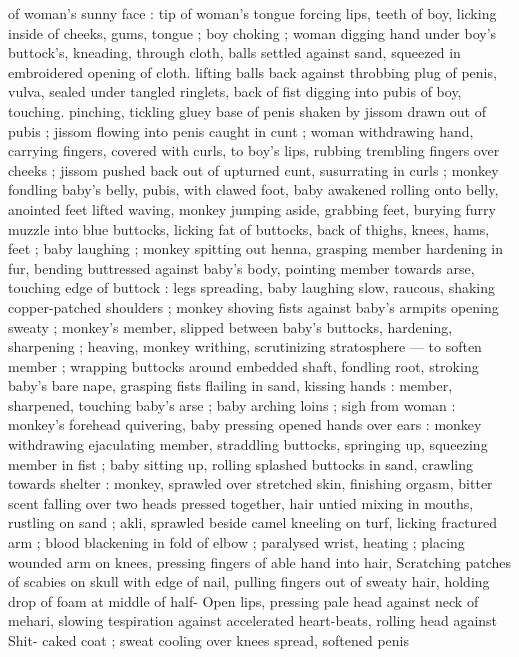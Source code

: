 {of woman's sunny face : tip of woman's tongue forcing lips, teeth of 
boy, licking inside of cheeks, gums, tongue ; boy choking ; woman 
digging hand under boy's buttock's, kneading, through cloth, balls 
settled against sand, squeezed in embroidered opening of cloth. 
lifting balls back against throbbing plug of penis, vulva, sealed under 
tangled ringlets, back of fist digging into pubis of boy, touching. 
pinching, tickling gluey base of penis shaken by jissom drawn out of 
pubis ; jissom flowing into penis caught in cunt ; woman withdrawing 
hand, carrying fingers, covered with curls, to boy's lips, rubbing 
trembling fingers over cheeks ; jissom pushed back out of upturned 
cunt, susurrating in curls ; monkey fondling baby's belly, pubis, with 
clawed foot, baby awakened rolling onto belly, anointed feet lifted 
waving, monkey jumping aside, grabbing feet, burying furry muzzle 
into blue buttocks, licking fat of buttocks, back of thighs, knees, 
hams, feet ; baby laughing ; monkey spitting out henna, grasping 
member hardening in fur, bending buttressed against baby's body, 
pointing member towards arse, touching edge of buttock : legs 
spreading, baby laughing slow, raucous, shaking copper-patched 
shoulders ; monkey shoving fists against baby's armpits opening 
sweaty ; monkey's member, slipped between baby's buttocks, 
hardening, sharpening ; heaving, monkey writhing, scrutinizing 
stratosphere --- to soften member ; wrapping buttocks around 
embedded shaft, fondling root, stroking baby's bare nape, grasping 
fists flailing in sand, kissing hands : member, sharpened, touching 
baby's arse ; baby arching loins ; sigh from woman : monkey's 
forehead quivering, baby pressing opened hands over ears : monkey 
withdrawing ejaculating member, straddling buttocks, springing up, 
squeezing member in fist ; baby sitting up, rolling splashed buttocks 
in sand, crawling towards shelter : monkey, sprawled over stretched 
skin, finishing orgasm, bitter scent falling over two heads pressed 
together, hair untied mixing in mouths, rustling on sand ; akli, 
sprawled beside camel kneeling on turf, licking fractured arm ; blood 
blackening in fold of elbow ; paralysed wrist, heating ; placing 
wounded arm on knees, pressing fingers of able hand into hair, 
Scratching patches of scabies on skull with edge of nail, pulling 
fingers out of sweaty hair, holding drop of foam at middle of half- 
Open lips, pressing pale head against neck of mehari, slowing 
tespiration against accelerated heart-beats, rolling head against 
Shit- caked coat ; sweat cooling over knees spread, softened penis 
}
